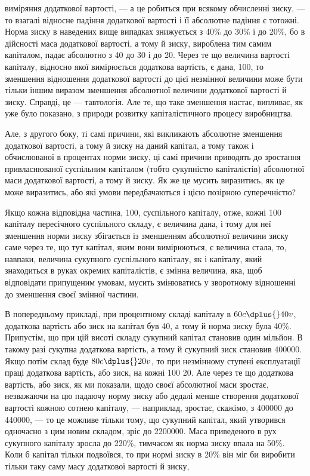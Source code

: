 \parcont{}  %
виміряння додаткової вартості, — а це робиться при всякому
обчисленні зиску, — то взагалі відносне падіння додаткової вартості
і її абсолютне падіння є тотожні. Норма зиску в наведених
вище випадках знижується з 40\% до 30\% і до 20\%, бо в дійсності
маса додаткової вартості, а тому й зиску, вироблена тим
самим капіталом, падає абсолютно з 40 до 30 і до 20. Через те
що величина вартості капіталу, відносно якої вимірюється додаткова
вартість, є дана, \deq{} 100, то зменшення відношення додаткової
вартості до цієї незмінної величини може бути тільки іншим
виразом зменшення абсолютної величини додаткової вартості
й зиску. Справді, це — тавтологія. Але те, що таке зменшення
настає, випливає, як уже було показано, з природи розвитку
капіталістичного процесу виробництва.

Але, з другого боку, ті самі причини, які викликають абсолютне
зменшення додаткової вартості, а тому й зиску на даний
капітал, а тому також і обчислюваної в процентах норми зиску,
ці самі причини приводять до зростання привласнюваної суспільним
капіталом (тобто сукупністю капіталістів) абсолютної маси
додаткової вартості, а тому й зиску. Як же це мусить виразитись,
як це може виразитись, або які умови передбачаються
і цією позірною суперечністю?

Якщо кожна відповідна частина, \deq{} 100, суспільного капіталу,
отже, кожні 100 капіталу пересічного суспільного складу, є величина
дана, і тому для неї зменшення норми зиску збігається
із зменшенням абсолютної величини зиску саме через те, що
тут капітал, яким вони вимірюються, є величина стала, то,
навпаки, величина сукупного суспільного капіталу, як і капіталу,
який знаходиться в руках окремих капіталістів, є змінна
величина, яка, щоб відповідати припущеним умовам, мусить
змінюватись у зворотному відношенні до зменшення своєї змінної
частини.

В попередньому прикладі, при процентному складі капіталу
в $60c \dplus{} 40v$, додаткова вартість або зиск на капітал був 40,
а тому й норма зиску була 40\%. Припустім, що при цій висоті
складу сукупний капітал становив один мільйон. В такому разі
сукупна додаткова вартість, а тому й сукупний зиск становив
\num{400000}. Якщо потім склад буде \deq{} $80c \dplus{} 20v$, то при незмінному
ступені експлуатації праці додаткова вартість, або зиск, на кожні
100 \deq{} 20. Але через те що додаткова вартість, або зиск, як ми
показали, щодо своєї абсолютної маси зростає, незважаючи на цю
падаючу норму зиску або дедалі менше створення додаткової
вартості кожною сотнею капіталу, — наприклад, зростає, скажімо,
з \num{400000} до \num{440000}, — то це можливе тільки тому, що сукупний
капітал, який утворився одночасно з цим новим складом, зріс
до \num{2200000}. Маса приведеного в рух сукупного капіталу зросла
до 220\%, тимчасом як норма зиску впала на 50\%. Коли б капітал
тільки подвоївся, то при нормі зиску в 20\% він міг би
виробити тільки таку саму масу додаткової вартості й зиску,
\parbreak{}  %
